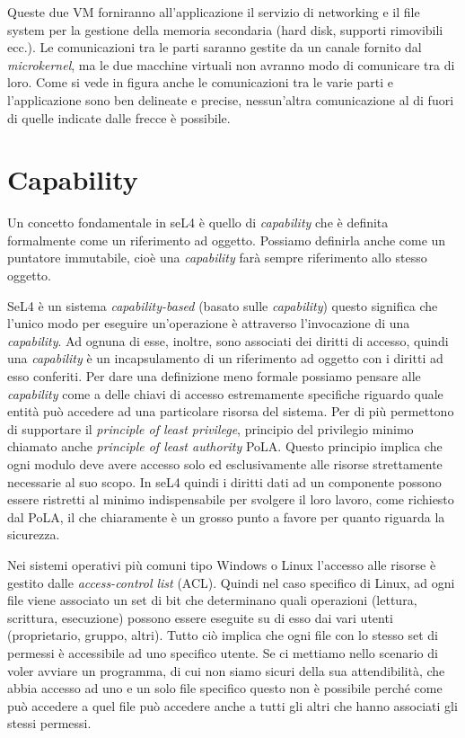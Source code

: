 Queste due VM forniranno all'applicazione il servizio di networking e il file system per la gestione della memoria secondaria (hard disk, supporti rimovibili ecc.). Le comunicazioni tra le parti saranno gestite da un canale fornito dal \textit{microkernel}, ma le due macchine virtuali non avranno modo di comunicare tra di loro. Come si vede in figura anche le comunicazioni tra le varie parti e l'applicazione sono ben delineate e precise, nessun'altra comunicazione al di fuori di quelle indicate dalle frecce è possibile.

\section{Capability}
Un concetto fondamentale in seL4 è quello di \textit{capability} che è definita formalmente come un riferimento ad oggetto. Possiamo definirla anche come un puntatore immutabile, cioè una \textit{capability} farà sempre riferimento allo stesso oggetto.

SeL4 è un sistema \textit{capability-based} (basato sulle \textit{capability}) questo significa che l'unico modo per eseguire un'operazione è attraverso l'invocazione di una \textit{capability}. Ad ognuna di esse, inoltre, sono associati dei diritti di accesso, quindi una \textit{capability} è un incapsulamento di un riferimento ad oggetto con i diritti ad esso conferiti.
Per dare una definizione meno formale possiamo pensare alle \textit{capability} come a delle chiavi di accesso estremamente specifiche riguardo quale entità può accedere ad una particolare risorsa del sistema. Per di più permettono di supportare il \textit{principle of least privilege}, principio del privilegio minimo chiamato anche \textit{principle of least authority} PoLA. Questo principio implica che ogni modulo deve avere accesso solo ed esclusivamente alle risorse strettamente necessarie al suo scopo.
In seL4 quindi i diritti dati ad un componente possono essere ristretti al minimo indispensabile per svolgere il loro lavoro, come richiesto dal PoLA, il che chiaramente è un grosso punto a favore per quanto riguarda la sicurezza.

Nei sistemi operativi più comuni tipo Windows o Linux l'accesso alle risorse è gestito dalle \textit{access-control list} (ACL). Quindi nel caso specifico di Linux, ad ogni file viene associato un set di bit che determinano quali operazioni (lettura, scrittura, esecuzione) possono essere eseguite su di esso dai vari utenti (proprietario, gruppo, altri). Tutto ciò implica che ogni file con lo stesso set di permessi è accessibile ad uno specifico utente. Se ci mettiamo nello scenario di voler avviare un programma, di cui non siamo sicuri della sua attendibilità, che abbia accesso ad uno e un solo file specifico questo non è possibile perché come può accedere a quel file può accedere anche a tutti gli altri che hanno associati gli stessi permessi.

